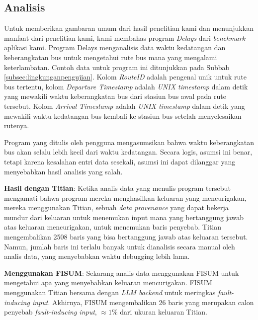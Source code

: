 \subsection{Analisis}
\label{subsec:analisis}

Untuk memberikan gambaran umum dari hasil penelitian kami 
dan menunjukkan manfaat dari penelitian kami, kami membahas 
program \emph{Delays} dari \emph{benchmark} aplikasi kami. 
Program Delays menganalisis data waktu kedatangan dan 
keberangkatan bus untuk mengetahui rute bus mana yang 
mengalami keterlambatan. Contoh data untuk program ini 
ditunjukkan pada Subbab \ref{subsec:lingkunganpengujian}.
Kolom \emph{RouteID} adalah pengenal unik untuk rute 
bus tertentu, kolom \emph{Departure Timestamp} adalah 
\emph{UNIX timestamp} dalam detik yang mewakili waktu 
keberangkatan bus dari stasiun bus awal pada rute tersebut. 
Kolom \emph{Arrival Timestamp} adalah \emph{UNIX timestamp} 
dalam detik yang mewakili waktu kedatangan bus kembali 
ke stasiun bus setelah menyelesaikan rutenya.

Program yang ditulis oleh pengguna mengasumsikan bahwa 
waktu keberangkatan bus akan selalu lebih kecil dari 
waktu kedatangan. Secara logis, asumsi ini benar, 
tetapi karena kesalahan entri data sesekali, asumsi 
ini dapat dilanggar yang menyebabkan hasil analisis 
yang salah.

\textbf{Hasil dengan Titian}: Ketika analis data yang 
menulis program tersebut mengamati bahwa program mereka 
menghasilkan keluaran yang mencurigakan, mereka 
menggunakan Titian, sebuah \emph{data provenance} 
yang dapat bekerja mundur dari keluaran untuk menemukan 
input mana yang bertanggung jawab atas keluaran 
mencurigakan, untuk menemukan baris penyebab. 
Titian mengembalikan 2508 baris yang bisa bertanggung 
jawab atas keluaran tersebut. Namun, jumlah baris ini 
terlalu banyak untuk dianalisis secara manual oleh 
analis data, yang menyebabkan waktu debugging lebih lama.

\textbf{Menggunakan FISUM}: Sekarang analis data 
menggunakan FISUM untuk mengetahui apa yang menyebabkan 
keluaran mencurigakan. FISUM menggunakan Titian bersama 
dengan \emph{LLM backend} untuk meringkas 
\emph{fault-inducing input}. Akhirnya, FISUM mengembalikan 
26 baris yang merupakan calon penyebab 
\emph{fault-inducing input}, $\approx 1\%$ dari ukuran 
keluaran Titian.



